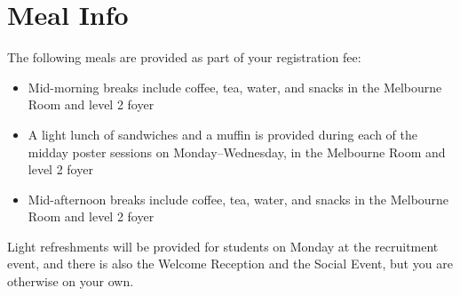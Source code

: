 \setheaders{}{}
\section{Meal Info}{}

The following meals are provided as part of your registration fee:

\begin{itemize}
\item Mid-morning breaks include coffee, tea, water, and snacks
	in the Melbourne Room and level 2 foyer
\item A light lunch of sandwiches and a muffin is provided during each
	of the midday poster sessions on Monday--Wednesday,
	in the Melbourne Room and level 2 foyer
\item Mid-afternoon breaks include coffee, tea, water, and 
	snacks in the Melbourne Room and level 2 foyer
\end{itemize}

Light refreshments will be provided for students on Monday at the
recruitment event, and there is also the Welcome Reception and the
Social Event, but you are otherwise on your own.

